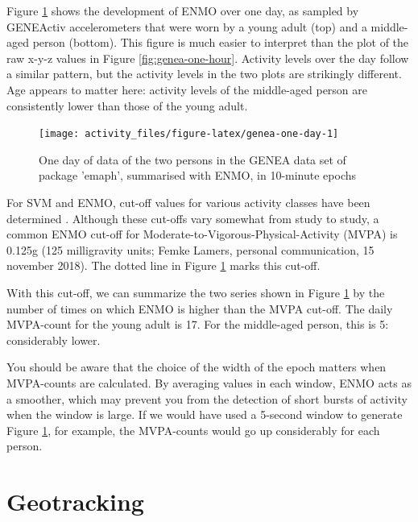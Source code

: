 \documentclass[]{book}
\begin{document}
Figure \ref{fig:genea-one-day} shows the development of ENMO over one
day, as sampled by GENEActiv accelerometers that were worn by a young
adult (top) and a middle-aged person (bottom). This figure is much
easier to interpret than the plot of the raw x-y-z values in Figure
\ref{fig:genea-one-hour}. Activity levels over the day follow a similar
pattern, but the activity levels in the two plots are strikingly
different. Age appears to matter here: activity levels of the
middle-aged person are consistently lower than those of the young adult.

\begin{figure}

{\centering \texttt{[image: activity\_files/figure-latex/genea-one-day-1]} 

}

\caption{One day of data of the two persons in the GENEA data set of package 'emaph', summarised with ENMO, in 10-minute epochs}\label{fig:genea-one-day}
\end{figure}


For SVM and ENMO, cut-off values for various activity classes have been
determined \citep{Dasilva2014, Hildebrand2014, Kim2017, Rowlands2016}.
Although these cut-offs vary somewhat from study to study, a common ENMO
cut-off for Moderate-to-Vigorous-Physical-Activity (MVPA) is 0.125g (125
milligravity units; Femke Lamers, personal communication, 15 november
2018). The dotted line in Figure \ref{fig:genea-one-day} marks this
cut-off.

With this cut-off, we can summarize the two series shown in Figure
\ref{fig:genea-one-day} by the number of times on which ENMO is higher
than the MVPA cut-off. The daily MVPA-count for the young adult is 17.
For the middle-aged person, this is 5: considerably lower.

You should be aware that the choice of the width of the epoch matters
when MVPA-counts are calculated. By averaging values in each window,
ENMO acts as a smoother, which may prevent you from the detection of
short bursts of activity when the window is large. If we would have used
a 5-second window to generate Figure \ref{fig:genea-one-day}, for
example, the MVPA-counts would go up considerably for each person.

\section{Geotracking}\label{geotracking}
\end{document}
